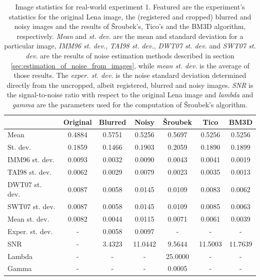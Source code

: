 \documentclass[12pt,notitlepage]{report}
\begin{document}
\begin{table}[htb]
  \centering
  \begin{tabular}{ | l | c | c | c | c | c | c | }
    \hline
		           & Original & Blurred & Noisy   & Šroubek & Tico    & BM3D    \\ \hline
	Mean           & 0.4884   & 0.5751  & 0.5256  & 0.5697  & 0.5256  & 0.5256  \\ \hline
	St. dev.       & 0.1859   & 0.1466  & 0.1903  & 0.2059  & 0.1890  & 0.1899  \\ \hline
	IMM96 st. dev. & 0.0093   & 0.0032  & 0.0090  & 0.0043  & 0.0041  & 0.0019  \\ \hline
	TAI98 st. dev. & 0.0062   & 0.0029  & 0.0079  & 0.0023  & 0.0035  & 0.0013  \\ \hline
	DWT07 st. dev. & 0.0087   & 0.0058  & 0.0145  & 0.0109  & 0.0083  & 0.0062  \\ \hline
	SWT07 st. dev. & 0.0087   & 0.0058  & 0.0145  & 0.0109  & 0.0085  & 0.0063  \\ \hline
	Mean st. dev.  & 0.0082   & 0.0044  & 0.0115  & 0.0071  & 0.0061  & 0.0039  \\ \hline
	Exper. st. dev.& -        & 0.0058  & 0.0097  & -       & -       & -       \\ \hline
	SNR            & -        & 3.4323  & 11.0442 & 9.5644  & 11.5003 & 11.7639 \\ \hline
	Lambda         & -        & -       & -       & 25.0000 & -       & -       \\ \hline
	Gamma          & -        & -       & -       & 0.0005  & -       & -       \\ \hline

  \end{tabular}
  \caption[Image statistics for real-world experiment 1]{Image statistics for real-world experiment 1. Featured are the experiment's statistics for the original Lena image, the (registered and cropped) blurred and noisy images and the results of Šroubek's, Tico's and the BM3D algorithm, respectively. {\em Mean} and {\em st. dev.} are the mean and standard deviation for a particular image, {\em IMM96 st. dev.}, {\em TAI98 st. dev.}, {\em DWT07 st. dev.} and {\em SWT07 st. dev.} are the results of noise estimation methods described in section \ref{sec:estimation_of_noise_from_images}, while {\em mean st. dev.} is the average of those results. The {\em exper. st. dev.} is the noise standard deviation determined directly from the uncropped, albeit registered, blurred and noisy images. {\em SNR} is the signal-to-noise ratio with respect to the original Lena image and {\em lambda} and {\em gamma} are the parameters used for the computation of Šroubek's algorithm.}
  \label{tab:experiment_001_statistics}
\end{table}
\end{document}
